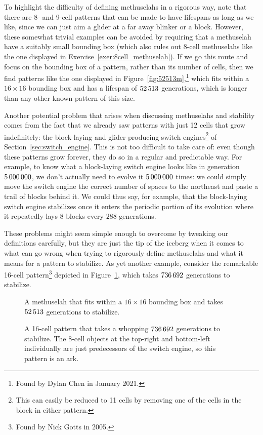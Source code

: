 To highlight the difficulty of defining methuselahs in a rigorous way, note that there are 8- and 9-cell patterns that can be made to have lifespans as long as we like, since we can just aim a glider at a far away blinker or a block. However, these somewhat trivial examples can be avoided by requiring that a methuselah have a suitably small bounding box (which also rules out $8$-cell methuselahs like the one displayed in Exercise~\ref{exer:8cell_methuselah}). If we go this route and focus on the bounding box of a pattern, rather than its number of cells, then we find patterns like the one displayed in Figure~\ref{fig:52513m},\footnote{Found by Dylan Chen in January 2021.} which fits within a $16 \times 16$ bounding box and has a lifespan of $52{\,}513$ generations, which is longer than any other known pattern of this size.

Another potential problem that arises when discussing methuselahs and stability comes from the fact that we already saw patterns with just 12 cells that grow indefinitely: the block-laying and glider-producing switch engines\footnote{This can easily be reduced to 11 cells by removing one of the cells in the block in either pattern.} of Section~\ref{sec:switch_engine}. This is not too difficult to take care of: even though these patterns grow forever, they do so in a regular and predictable way. For example, to know what a block-laying switch engine looks like in generation $5{\,}000{\,}000$, we don't actually need to evolve it $5{\,}000{\,}000$ times: we could simply move the switch engine the correct number of spaces to the northeast and paste a trail of blocks behind it. We could thus say, for example, that the block-laying switch engine stabilizes once it enters the periodic portion of its evolution where it repeatedly lays $8$ blocks every $288$ generations.

These problems might seem simple enough to overcome by tweaking our definitions carefully, but they are just the tip of the iceberg when it comes to what can go wrong when trying to rigorously define methuselahs and what it means for a pattern to stabilize. As yet another example, consider the remarkable 16-cell pattern\footnote{Found by Nick Gotts in 2005.} depicted in Figure~\ref{fig:ark_736692}, which takes $736{\,}692$ generations to stabilize.

\begin{figure}[!htb]
	\centering
	\begin{minipage}[b]{0.4\textwidth}
		\centering{}
		\caption{A methuselah that fits within a $16 \times 16$ bounding box and takes $52{\,}513$ generations to stabilize.}\label{fig:52513m}
	\end{minipage}\hfill
	\begin{minipage}[b]{0.56\textwidth}
		\centering{}
		\caption{A 16-cell pattern that takes a whopping $736{\,}692$ generations to stabilize. The $8$-cell objects at the top-right and bottom-left individually are just predecessors of the switch engine, so this pattern is an ark.}\label{fig:ark_736692}
	\end{minipage}
\end{figure}

